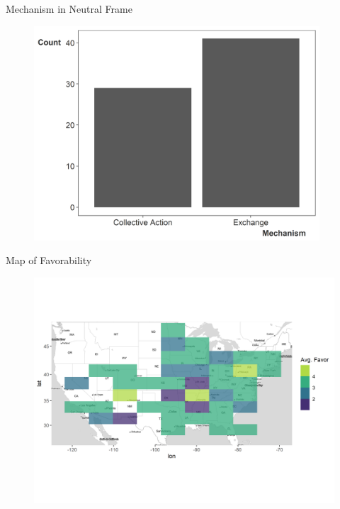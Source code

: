 \documentclass[12pt]{beamer}
\begin{document}


\begin{frame}{Mechanism in Neutral Frame}

\begin{figure}[htbp]
	\centering
		\includegraphics[width=0.95\textwidth]{neutral-mech.png}
\end{figure}


\end{frame}



\begin{frame}{Map of Favorability}

\begin{figure}[htbp]
\centering
   \includegraphics[width=.95\textwidth]{favor-map.png}
\end{figure}

\end{frame}
\end{document}
